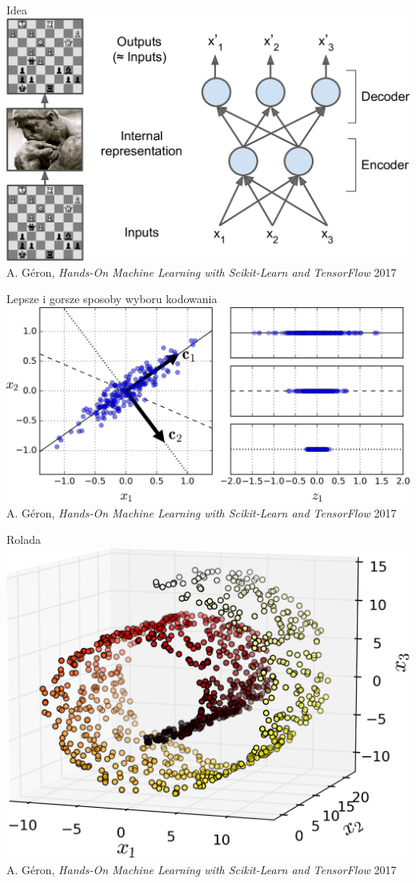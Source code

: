 \documentclass{sa}
\subtitle{Autoenkodery}
\begin{document}
\begin{frame}
\titlepage
\end{frame}
\begin{frame}{Idea}
	\centering
	\includegraphics[width=\textwidth]{mlst_1501.png}
	{\vfill\footnotesize A. Géron, \emph{Hands-On Machine Learning with Scikit-Learn and TensorFlow} 2017}
\end{frame}
\begin{frame}{Lepsze i gorsze sposoby wyboru kodowania}
		\centering
	\includegraphics[width=\textwidth]{mlst_0807.png}
	{\vfill\footnotesize A. Géron, \emph{Hands-On Machine Learning with Scikit-Learn and TensorFlow} 2017}
\end{frame}
\begin{frame}{Rolada}
			\centering
	\includegraphics[width=.8\textwidth]{mlst_0804.png}
	{\vfill\footnotesize A. Géron, \emph{Hands-On Machine Learning with Scikit-Learn and TensorFlow} 2017}
\end{frame}
\end{document}
